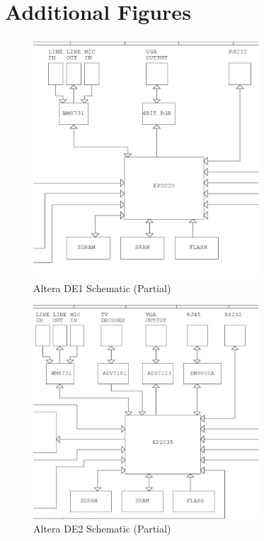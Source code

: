 \documentclass[12pt]{article} %
\begin{document}
\section{Additional Figures} \label{sec:add}
\begin{figure}[h]
\centering
\includegraphics[width=0.75\textwidth]{./images/DE1_schem.jpg}
\caption{Altera DE1 Schematic (Partial)}
\label{fig:de1}    
\end{figure}
\begin{figure}[h]
\centering
\includegraphics[width=0.75\textwidth]{./images/DE2_schem.jpg}
\caption{Altera DE2 Schematic (Partial)}
\label{fig:de2}    
\end{figure}
\end{document}
